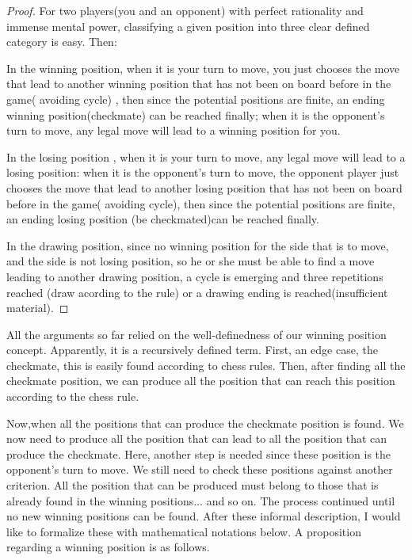 \begin{proof}
For two players(you and an opponent) with perfect rationality and immense mental power, classifying a given position into three clear defined category is easy. Then:

In the winning position, when it is your turn to move, you just chooses the move that lead to another winning position that has not been on board before in the game( avoiding cycle)
, then since the potential positions are finite, an ending winning position(checkmate) can be reached finally; when it is the opponent's turn to move, any legal move will lead to a winning position for you. 

In the losing position , when it is your turn to move, any legal move will lead to a losing position: when it is the opponent's turn to move,
the opponent player just chooses the move that lead to another losing position that has not been on board before in the game( avoiding cycle), then since the potential positions are finite, an ending losing position (be checkmated)can be reached finally. 

In the drawing position, since no winning position for the side that is to move, and the side is not losing position, so he or she must be able to find a move leading to another drawing position, a cycle is emerging and three repetitions reached (draw acording to the rule) or
 a drawing ending is reached(insufficient material).  
\end{proof}

All the arguments so far relied on the well-definedness of our winning position concept. Apparently, it is a recursively defined term. First, an edge case, the checkmate, this is easily found 
according to chess rules. Then, after finding all the checkmate position, we can produce all the position that can reach this position according to the chess rule.

Now,when all the positions that can produce the checkmate position is found. We now need to produce all the position that can lead to all the position that can produce the checkmate. 
Here, another step is needed since these position is the opponent's turn to move. We still need to check these positions against another criterion. 
All the position that can be produced must belong to those that is already found in the winning positions... and so on. The process continued until no new winning positions can be found.
After these informal description, I would like to formalize these with mathematical notations below. A proposition regarding a winning position is as follows.


